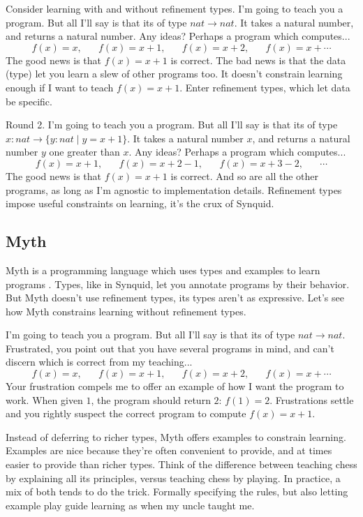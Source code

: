 Consider learning with and without refinement types. I'm going to teach you a program. But all I'll say is that its of type $nat \!\to\! nat$. It takes a natural number, and returns a natural number. Any ideas? Perhaps a program which computes...
$$f(x) = x, \;\;\;\;\;\;f(x) = x + 1,\;\;\;\;\;\; f(x) = x + 2,\;\;\;\;\;\; f(x) = x + \cdots$$
The good news is that $f(x) = x + 1$ is correct. The bad news is that the data (type) let you learn a slew of other programs too. It doesn't constrain learning enough if I want to teach $f(x) = x + 1$. Enter refinement types, which let data be specific.

Round 2. I'm going to teach you a program. But all I'll say is that its of type $x{:}nat \!\to \!\{y{:}nat \mid y = x + 1\}$. It takes a natural number $x$, and returns a natural number $y$ one greater than $x$. Any ideas? Perhaps a program which computes...
$$f(x) = x + 1,\;\;\;\;\;\; f(x) = x + 2 - 1,\;\;\;\;\;\; f(x) = x + 3 - 2,\;\;\;\;\;\;\cdots$$
The good news is that $f(x) = x + 1$ is correct. And so are all the other programs, as long as I'm agnostic to implementation details. Refinement types impose useful constraints on learning, it's the crux of Synquid.

\subsection{Myth}
Myth is a programming language which uses types and examples to learn programs \cite{osera2015program}. Types, like in Synquid, let you annotate programs by their behavior. But Myth doesn't use refinement types, its types aren't as expressive. Let's see how Myth constrains learning without refinement types.

I'm going to teach you a program. But all I'll say is that its of type $nat \!\to\! nat$. Frustrated, you point out that you have several programs in mind, and can't discern which is correct from my teaching...
$$f(x) = x, \;\;\;\;\;\;f(x) = x + 1,\;\;\;\;\;\; f(x) = x + 2,\;\;\;\;\;\; f(x) = x + \cdots$$
Your frustration compels me to offer an example of how I want the program to work. When given $1$, the program should return $2$: $f(1) = 2$. Frustrations settle and you rightly suspect the correct program to compute $f(x) = x + 1$. 

Instead of deferring to richer types, Myth offers examples to constrain learning. Examples are nice because they're often convenient to provide, and at times easier to provide than richer types. Think of the difference between teaching chess by explaining all its principles, versus teaching chess by playing. In practice, a mix of both tends to do the trick. Formally specifying the rules, but also letting example play guide learning as when my uncle taught me.

